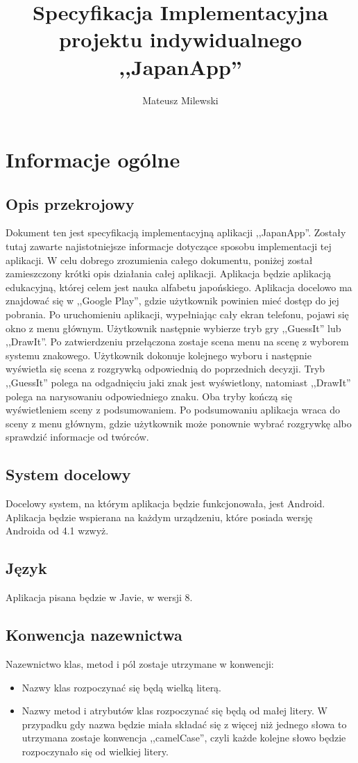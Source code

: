 \documentclass[15pt]{article}
\author{Mateusz Milewski}
\title{\textbf{Specyfikacja Implementacyjna projektu indywidualnego ,,JapanApp''}}
\begin{document}
  \maketitle
  \tableofcontents
  \clearpage
  \section{Informacje ogólne}
  \subsection{Opis przekrojowy}
  Dokument ten jest specyfikacją implementacyjną aplikacji ,,JapanApp''. Zostały tutaj zawarte najistotniejsze informacje dotyczące sposobu implementacji tej aplikacji. W celu dobrego zrozumienia całego dokumentu, poniżej został zamieszczony krótki opis działania całej aplikacji.
  \newline
  \newline
  Aplikacja będzie aplikacją edukacyjną, której celem jest nauka alfabetu japońskiego. Aplikacja docelowo ma znajdować się w ,,Google Play'', gdzie użytkownik powinien mieć dostęp do jej pobrania. Po uruchomieniu aplikacji, wypełniając cały ekran telefonu, pojawi się okno z menu głównym. Użytkownik następnie wybierze tryb gry ,,GuessIt'' lub ,,DrawIt''. Po zatwierdzeniu przełączona zostaje scena menu na scenę z wyborem systemu znakowego. Użytkownik dokonuje kolejnego wyboru i następnie wyświetla się scena z rozgrywką odpowiednią do poprzednich decyzji. Tryb ,,GuessIt'' polega na odgadnięciu jaki znak jest wyświetlony, natomiast ,,DrawIt'' polega na narysowaniu odpowiedniego znaku. Oba tryby kończą się wyświetleniem sceny z podsumowaniem. Po podsumowaniu aplikacja wraca do sceny z menu głównym, gdzie użytkownik może ponownie wybrać rozgrywkę albo sprawdzić informacje od twórców.
  
  \subsection{System docelowy}
  Docelowy system, na którym aplikacja będzie funkcjonowała, jest Android. Aplikacja będzie wspierana na każdym urządzeniu, które posiada wersję Androida od 4.1 wzwyż. 
  \subsection{Język}
  Aplikacja pisana będzie w Javie, w wersji 8.
  \subsection{Konwencja nazewnictwa} 
  Nazewnictwo klas, metod i pól zostaje utrzymane w konwencji:
  \begin{itemize}
    \item Nazwy klas rozpoczynać się będą wielką literą.
    \item Nazwy metod i atrybutów klas rozpoczynać się będą od małej litery. W przypadku gdy nazwa będzie miała składać się z więcej niż jednego słowa to utrzymana zostaje konwencja ,,camelCase'', czyli każde kolejne słowo będzie rozpoczynało się od wielkiej litery.
  \end{itemize}
  
\end{document}
